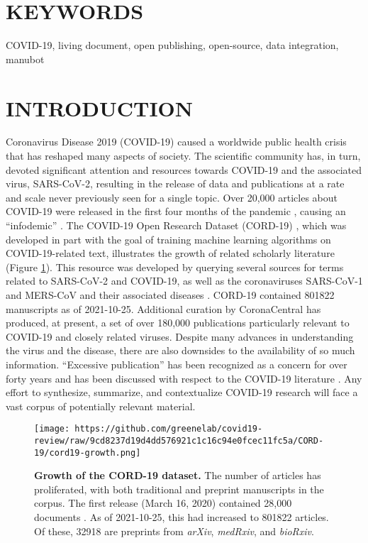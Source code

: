 \documentclass[twocolumn]{ceurart}
\begin{document}
\hypertarget{keywords}{%
\section*{KEYWORDS}\label{keywords}}

COVID-19, living document, open publishing, open-source, data integration, manubot

\hypertarget{introduction}{%
\section{INTRODUCTION}\label{introduction}}

Coronavirus Disease 2019 (COVID-19) caused a worldwide public health crisis that has reshaped many aspects of society.
The scientific community has, in turn, devoted significant attention and resources towards COVID-19 and the associated virus, SARS-CoV-2, resulting in the release of data and publications at a rate and scale never previously seen for a single topic.
Over 20,000 articles about COVID-19 were released in the first four months of the pandemic \citep{7ub6VM4Z}, causing an ``infodemic'' \citep{7ub6VM4Z, nnfOazAC}.
The COVID-19 Open Research Dataset (CORD-19) \citep{CiOwklc6}, which was developed in part with the goal of training machine learning algorithms on COVID-19-related text, illustrates the growth of related scholarly literature (Figure \ref{fig:cord19-growth}).
This resource was developed by querying several sources for terms related to SARS-CoV-2 and COVID-19, as well as the coronaviruses SARS-CoV-1 and MERS-CoV and their associated diseases \citep{CiOwklc6}.
CORD-19 contained 801822 manuscripts as of 2021-10-25.
Additional curation by CoronaCentral \citep{Ybg667S0} has produced, at present, a set of over 180,000 publications particularly relevant to COVID-19 and closely related viruses.
Despite many advances in understanding the virus and the disease, there are also downsides to the availability of so much information.
``Excessive publication'' has been recognized as a concern for over forty years \citep{DfSr1Ohc} and has been discussed with respect to the COVID-19 literature \citep{dUvvJvv6}.
Any effort to synthesize, summarize, and contextualize COVID-19 research will face a vast corpus of potentially relevant material.

\begin{figure}
\hypertarget{fig:cord19-growth}{%
\centering
\texttt{[image: https://github.com/greenelab/covid19-review/raw/9cd8237d19d4dd576921c1c16c94e0fcec11fc5a/CORD-19/cord19-growth.png]}
\caption{\textbf{Growth of the CORD-19 dataset.}
The number of articles has proliferated, with both traditional and preprint manuscripts in the corpus.
The first release (March 16, 2020) contained 28,000 documents \citep{CiOwklc6}.
As of 2021-10-25, this had increased to 801822 articles.
Of these, 32918 are preprints from \emph{arXiv}, \emph{medRxiv}, and \emph{bioRxiv}.}\label{fig:cord19-growth}
}
\end{figure}
\end{document}
